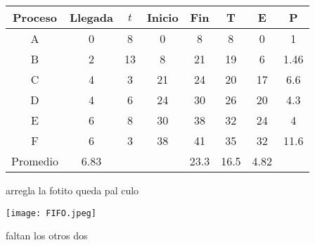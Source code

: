 \documentclass[11pt]{article}
\begin{document}
\begin{center}
\begin{tabular}{|c|c|c|c|c|c|c|c|}
    \hline
    Proceso & Llegada & $t$ & Inicio & Fin & T & E & P \\
    \hline
    A & 0 & 8 & 0 & 8 & 8 & 0 & 1 \\
    \hline
    B & 2 & 13 & 8 & 21 & 19 & 6 & 1.46 \\
    \hline
    C & 4 & 3 & 21 & 24 & 20 & 17 & 6.6 \\
    \hline
    D & 4 & 6 & 24 & 30 & 26 & 20 & 4.3 \\
    \hline
    E & 6 & 8 & 30 & 38 & 32 & 24 & 4 \\
    \hline
    F & 6 & 3 & 38 & 41 & 35 & 32 & 11.6 \\ 
    \hline
    Promedio & 6.83 & & & 23.3 & 16.5 & 4.82 &\\
    \hline
\end{tabular}
\end{center}

arregla la fotito queda pal culo

\texttt{[image: FIFO.jpeg]}

faltan los otros dos 
\end{document}
